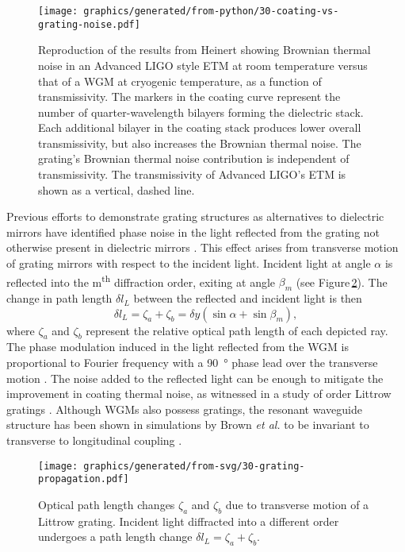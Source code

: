 \begin{figure}
  \centering
  \texttt{[image: graphics/generated/from-python/30-coating-vs-grating-noise.pdf]}
  \caption{\label{fig:coating-vs-grating-noise}Reproduction of the results from Heinert \etal{} \cite{Heinert2013} showing Brownian thermal noise in an Advanced LIGO style \gls{ETM} at room temperature versus that of a \gls{WGM} at cryogenic temperature, as a function of transmissivity. The markers in the coating curve represent the number of quarter-wavelength bilayers forming the dielectric stack. Each additional bilayer in the coating stack produces lower overall transmissivity, but also increases the Brownian thermal noise. The grating's Brownian thermal noise contribution is independent of transmissivity. The transmissivity of Advanced LIGO's ETM is shown as a vertical, dashed line.}
\end{figure}

Previous efforts to demonstrate grating structures as alternatives to dielectric mirrors have identified phase noise in the light reflected from the grating not otherwise present in dielectric mirrors \cite{Wise2005, Freise2007}. This effect arises from transverse motion of grating mirrors with respect to the incident light. Incident light at angle $\alpha$ is reflected into the m\textsuperscript{th} diffraction order, exiting at angle $\beta_m$ (see Figure\,\ref{fig:grating-propagation}). The change in path length $\delta l_L$ between the reflected and incident light is then
\begin{equation}
  \delta l_L = \zeta_a + \zeta_b = \delta y
  \left( \sin{\alpha} + \sin{\beta_m} \right),
\end{equation}
where $\zeta_a$ and $\zeta_b$ represent the relative optical path length of each depicted ray.
The phase modulation induced in the light reflected from the \gls{WGM} is proportional to Fourier frequency with a \SI{90}{\degree} phase lead over the transverse motion \cite{Barr2011}. The noise added to the reflected light can be enough to mitigate the improvement in coating thermal noise, as witnessed in a study of  order Littrow gratings \cite{Barr2011}. Although \gls{WGM}s also possess gratings, the resonant waveguide structure has been shown in simulations by Brown \emph{et al.} to be invariant to transverse to longitudinal coupling \cite{Brown2013}.

\begin{figure}
  \centering
  \texttt{[image: graphics/generated/from-svg/30-grating-propagation.pdf]}
  \caption{\label{fig:grating-propagation}Optical path length changes $\zeta_a$ and $\zeta_b$ due to transverse motion of a Littrow grating. Incident light diffracted into a different order undergoes a path length change $\delta l_L = \zeta_a + \zeta_b$.}
\end{figure}


